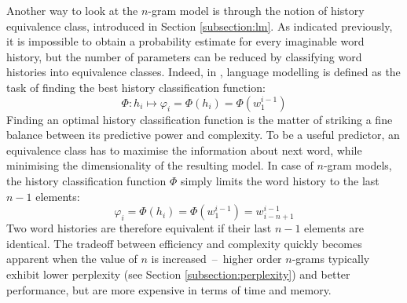 Another way to look at the $n$-gram model is through the notion of history equivalence class, introduced in Section \ref{subsection:lm}. As indicated previously, it is impossible to obtain a probability estimate for every imaginable word history, but the number of parameters can be reduced by classifying word histories into equivalence classes. Indeed, in \cite{jelinek1997statistical}, language modelling is defined as the task of finding the best history classification function:
\begin{equation}
	\Phi:h_{i}\mapsto\varphi_{i}=\Phi(h_{i})=\Phi(w_{1}^{i-1})
\end{equation}
Finding an optimal history classification function is the matter of striking a fine balance between its predictive power and complexity. To be a useful predictor, an equivalence class has to maximise the information about next word, while minimising the dimensionality of the resulting model. In case of $n$-gram models, the history classification function $\Phi$ simply limits the word history to the last $n-1$ elements:
\begin{equation}
	\varphi_{i}=\Phi(h_{i})=\Phi(w_{1}^{i-1})=w_{i-n+1}^{i-1}
\end{equation}
Two word histories are therefore equivalent if their last $n-1$ elements are identical. The tradeoff between efficiency and complexity quickly becomes apparent when the value of $n$ is increased~--~higher order $n$-grams typically exhibit lower perplexity (see Section \ref{subsection:perplexity}) and better performance, but are more expensive in terms of time and memory.
